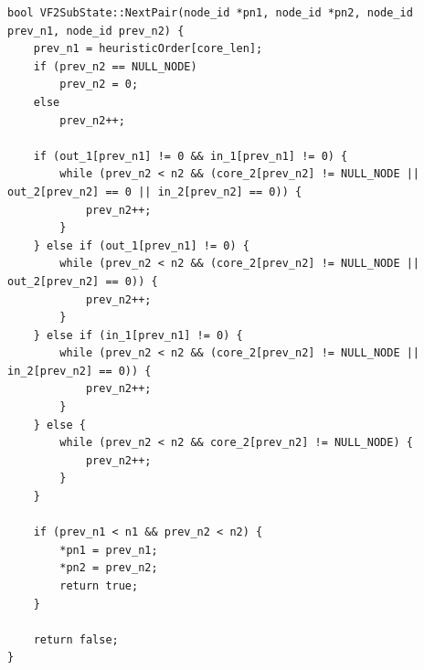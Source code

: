 \documentclass[a4paper, 12pt, ]{book}
\begin{document}
\clearpage
	\begin{lstlisting}[frame=tb, caption={Sprememba kode v knjižnici vflib za vključitev izboljšave algoritma VF2; \texttt{heuristicOrder} je vrnjena tabela iz	
	algoritma~\ref{app_vf2+sub}}, label={app_vf2+sub1}]
	bool VF2SubState::NextPair(node_id *pn1, node_id *pn2, node_id prev_n1, node_id prev_n2) {
	prev_n1 = heuristicOrder[core_len];
	if (prev_n2 == NULL_NODE)
		prev_n2 = 0;
	else
		prev_n2++;

	if (out_1[prev_n1] != 0 && in_1[prev_n1] != 0) {
		while (prev_n2 < n2 && (core_2[prev_n2] != NULL_NODE || out_2[prev_n2] == 0 || in_2[prev_n2] == 0)) {
			prev_n2++;
		}
	} else if (out_1[prev_n1] != 0) {
		while (prev_n2 < n2 && (core_2[prev_n2] != NULL_NODE || out_2[prev_n2] == 0)) {
			prev_n2++;
		}
	} else if (in_1[prev_n1] != 0) {
		while (prev_n2 < n2 && (core_2[prev_n2] != NULL_NODE || in_2[prev_n2] == 0)) {
			prev_n2++;
		}
	} else {
		while (prev_n2 < n2 && core_2[prev_n2] != NULL_NODE) {
			prev_n2++;
		}
	}

	if (prev_n1 < n1 && prev_n2 < n2) {
		*pn1 = prev_n1;
		*pn2 = prev_n2;
		return true;
	}

	return false;
}
	\end{lstlisting}
\end{document}
